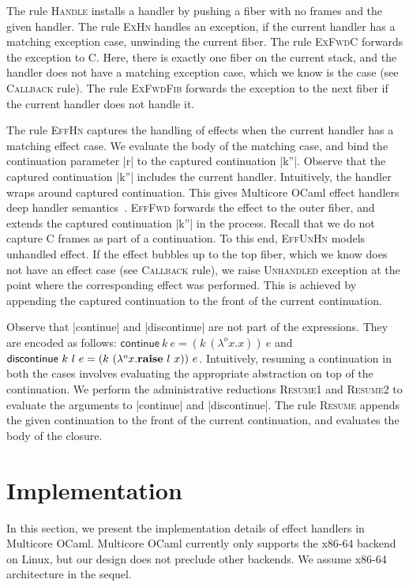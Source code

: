 \documentclass[sigplan,10pt,review,anonymous]{acmart}\settopmatter{printfolios=true,printccs=false,printacmref=false}
\newcommand{\olam}[2]{\lambda^o #1. #2}
\newcommand{\kw}[1]{\text{\bf #1}}
\newcommand{\throw}[2]{\kw{raise} ~#1 ~#2}
\begin{document}
The rule \textsc{Handle} installs a handler by pushing a fiber with no frames
and the given handler. The rule \textsc{ExHn} handles an exception, if the
current handler has a matching exception case, unwinding the current fiber. The
rule \textsc{ExFwdC} forwards the exception to C. Here, there is exactly one
fiber on the current stack, and the handler does not have a matching exception
case, which we know is the case (see \textsc{Callback} rule). The rule
\textsc{ExFwdFib} forwards the exception to the next fiber if the current
handler does not handle it.

The rule \textsc{EffHn} captures the handling of effects when the current
handler has a matching effect case. We evaluate the body of the matching case,
and bind the continuation parameter |r| to the captured continuation |k''|.
Observe that the captured continuation |k''| includes the current handler.
Intuitively, the handler wraps around captured continuation. This gives
Multicore OCaml effect handlers deep handler semantics~\cite{Hillerstrom20}.
\textsc{EffFwd} forwards the effect to the outer fiber, and extends the
captured continuation |k''| in the process. Recall that we do not capture C
frames as part of a continuation. To this end, \textsc{EffUnHn} models
unhandled effect. If the effect bubbles up to the top fiber, which we know does
not have an effect case (see \textsc{Callback} rule), we raise
\textsc{Unhandled} exception at the point where the corresponding effect was
performed. This is achieved by appending the captured continuation to the front
of the current continuation.

Observe that |continue| and |discontinue| are not part of the expressions. They
are encoded as follows: $\textsf{continue} ~k ~e = (k ~(\olam{x}{x})) ~e$ and
$\textsf{discontinue} ~k ~l ~e = (k ~(\olam{x}{\throw{l}{x}})) ~e$.
Intuitively, resuming a continuation in both the cases involves evaluating the
appropriate abstraction on top of the continuation. We perform the
administrative reductions \textsc{Resume1} and \textsc{Resume2} to evaluate the
arguments to |continue| and |discontinue|. The rule \textsc{Resume} appends the
given continuation to the front of the current continuation, and evaluates the
body of the closure.

\section{Implementation}
\label{sec:impl}

In this section, we present the implementation details of effect handlers in
Multicore OCaml. Multicore OCaml currently only supports the x86-64 backend on
Linux, but our design does not preclude other backends. We assume x86-64
architecture in the sequel.
\end{document}
